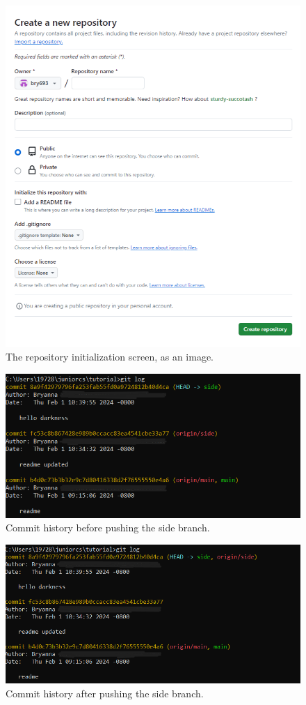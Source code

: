 \documentclass[10pt]{article}
\begin{document}
\begin{figure}[t]
    \includegraphics[width=.75\linewidth]{fig1.png}
\centering    
\caption{
        The repository initialization screen, as an image.
    }
    \label{fig:Fig1}
\end{figure}

\begin{figure}
    \includegraphics[width=.6\linewidth]{before.png}
\centering
    \caption{
        Commit history before pushing the side branch.
    }
    \label{fig:Fig2}
\end{figure}

\begin{figure}
    \includegraphics[width=.6\linewidth]{after.png}
\centering
    \caption{
        Commit history after pushing the side branch.
    }
    \label{fig:Fig3}
\end{figure}
\end{document}
